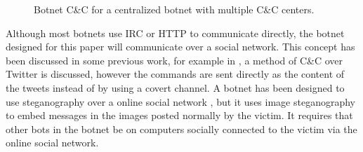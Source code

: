 \begin{figure}
\centering
{}
\caption{Botnet C\&C for a centralized botnet with multiple C\&C centers.}
\label{fig:lit-review:botnets:centralized-multiple}
\end{figure}

Although most botnets use IRC or HTTP to communicate directly, the botnet
designed for this paper will communicate over a social network.  This concept
has been discussed in some previous work, for example in \cite{twitter-botnet},
a method of C\&C over Twitter is discussed, however the commands are sent
directly as the content of the tweets instead of by using a covert channel.  A
botnet has been designed to use steganography over a online social network
\cite{stegobot}, but it uses image steganography to embed messages in the images
posted normally by the victim.  It requires that other bots in the botnet be on
computers socially connected to the victim via the online social network.
